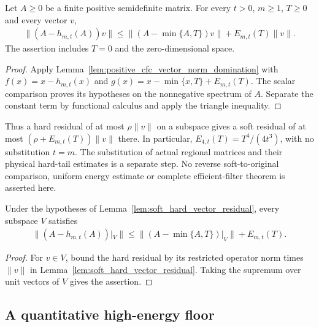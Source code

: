 \begin{lemma}
    \label{lem:soft_hard_vector_residual}
    \leanok
    Let $A\geq0$ be a finite positive semidefinite matrix. For every
    $t>0$, $m\geq1$, $T\geq0$ and every vector $v$,
    \begin{align}
        \|(A-h_{m,t}(A))v\|
        \leq\|(A-\min\{A,T\})v\|+E_{m,t}(T)\|v\|.
    \end{align}
    The assertion includes $T=0$ and the zero-dimensional space.
\end{lemma}
\begin{proof}\leanok
    Apply Lemma~\ref{lem:positive_cfc_vector_norm_domination} with
    $f(x)=x-h_{m,t}(x)$ and $g(x)=x-\min\{x,T\}+E_{m,t}(T)$.
    The scalar comparison proves its hypotheses on the nonnegative
    spectrum of $A$. Separate the constant term by functional calculus
    and apply the triangle inequality.
\end{proof}

Thus a hard residual of at most $\rho\|v\|$ on a subspace gives a soft
residual of at most $(\rho+E_{m,t}(T))\|v\|$ there. In particular,
$E_{4,t}(T)=T^4/(4t^3)$, with no substitution $t=m$. The substitution
of actual regional matrices and their physical hard-tail estimates is
a separate step. No reverse soft-to-original comparison, uniform energy
estimate or complete efficient-filter theorem is asserted here.

\begin{lemma}
    \label{lem:soft_hard_restricted_residual}
    \leanok
    Under the hypotheses of Lemma~\ref{lem:soft_hard_vector_residual},
    every subspace $V$ satisfies
    \begin{align}
        \|(A-h_{m,t}(A))|_V\|
        \leq\|(A-\min\{A,T\})|_V\|+E_{m,t}(T).
    \end{align}
\end{lemma}
\begin{proof}\leanok
    For $v\in V$, bound the hard residual by its restricted operator
    norm times $\|v\|$ in Lemma~\ref{lem:soft_hard_vector_residual}.
    Taking the supremum over unit vectors of $V$ gives the assertion.
\end{proof}


\subsection{A quantitative high-energy floor}


